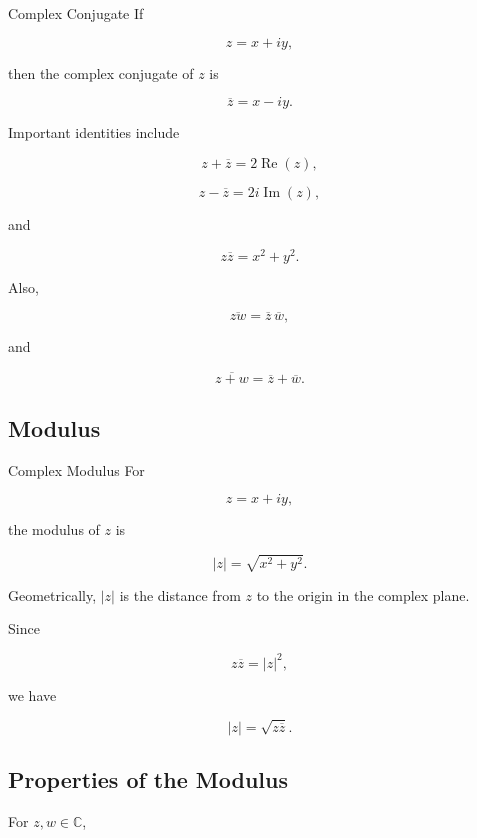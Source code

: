 \begin{definitionbox}{Complex Conjugate}
If

\[
z=x+iy,
\]

then the complex conjugate of \(z\) is

\[
\boxed{
\overline{z}=x-iy.
}
\]
\end{definitionbox}

Important identities include

\[
\boxed{
z+\overline{z}=2\operatorname{Re}(z),
}
\]

\[
\boxed{
z-\overline{z}=2i\operatorname{Im}(z),
}
\]

and

\[
\boxed{
z\overline{z}=x^2+y^2.
}
\]

Also,

\[
\overline{zw}
=
\overline{z}\,\overline{w},
\]

and

\[
\overline{z+w}
=
\overline{z}+\overline{w}.
\]

\subsection{Modulus}
\label{subsec:complex-modulus}

\begin{definitionbox}{Complex Modulus}
For

\[
z=x+iy,
\]

the modulus of \(z\) is

\[
\boxed{
|z|
=
\sqrt{x^2+y^2}.
}
\]
\end{definitionbox}

Geometrically, \(|z|\) is the distance from \(z\) to the origin in the
complex plane.

Since

\[
z\overline{z}=|z|^2,
\]

we have

\[
\boxed{
|z|
=
\sqrt{z\overline{z}}.
}
\]

\subsection{Properties of the Modulus}
\label{subsec:properties-complex-modulus}

For \(z,w\in\mathbb{C}\),

